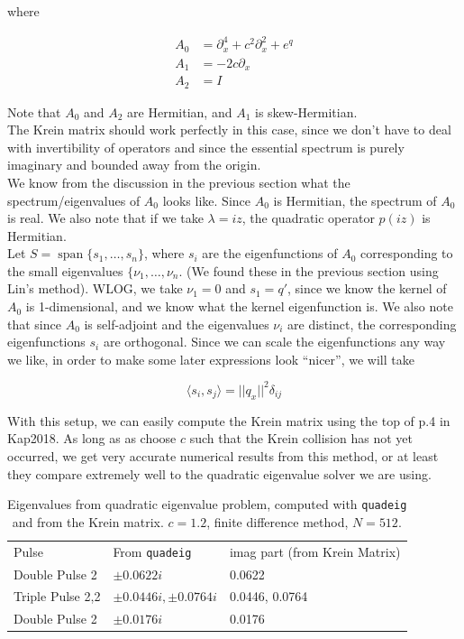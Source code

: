 \documentclass[12pt]{article}
\DeclareMathOperator{\spn}{span}
\begin{document}
where

\begin{align*}
A_0 &= \partial_x^4 + c^2 \partial_x^2 + e^{q} \\
A_1 &= - 2 c \partial_x \\
A_2 &= I 
\end{align*}

Note that $A_0$ and $A_2$ are Hermitian, and $A_1$ is skew-Hermitian.\\

The Krein matrix should work perfectly in this case, since we don't have to deal with invertibility of operators and since the essential spectrum is purely imaginary and bounded away from the origin.\\

We know from the discussion in the previous section what the spectrum/eigenvalues of $A_0$ looks like. Since $A_0$ is Hermitian, the spectrum of $A_0$ is real. We also note that if we take $\lambda = i z$, the quadratic operator $p(iz)$ is Hermitian.
\\

Let $S = \spn\{s_1, \dots, s_n \}$, where $s_i$ are the eigenfunctions of $A_0$ corresponding to the small eigenvalues $\{\nu_1, \dots, \nu_n$. (We found these in the previous section using Lin's method). WLOG, we take $\nu_1 = 0$ and $s_1 = q'$, since we know the kernel of $A_0$ is 1-dimensional, and we know what the kernel eigenfunction is. We also note that since $A_0$ is self-adjoint and the eigenvalues $\nu_i$ are distinct, the corresponding eigenfunctions $s_i$ are orthogonal. Since we can scale the eigenfunctions any way we like, in order to make some later expressions look ``nicer'', we will take

\begin{equation}\label{orthonormaleigs}
\langle s_i, s_j \rangle = ||q_x||^2 \delta_{ij}
\end{equation}

With this setup, we can easily compute the Krein matrix using the top of p.4 in Kap2018. As long as as choose $c$ such that the Krein collision has not yet occurred, we get very accurate numerical results from this method, or at least they compare extremely well to the quadratic eigenvalue solver we are using. 

\begin{table}[H]
\begin{tabular}{lll}
Pulse & From \texttt{quadeig} & imag part (from Krein Matrix) \\
Double Pulse 2    & $\pm 0.0622i$ & 0.0622 \\
Triple Pulse 2,2  & $\pm 0.0446i, \pm 0.0764i$ & 0.0446, 0.0764 \\
Double Pulse 2    & $\pm 0.0176i$ & 0.0176 \\
\end{tabular}
\caption{Eigenvalues from quadratic eigenvalue problem, computed with \texttt{quadeig} and from the Krein matrix. $c = 1.2$, finite difference method, $N = 512$. }
\end{table}
\end{document}
